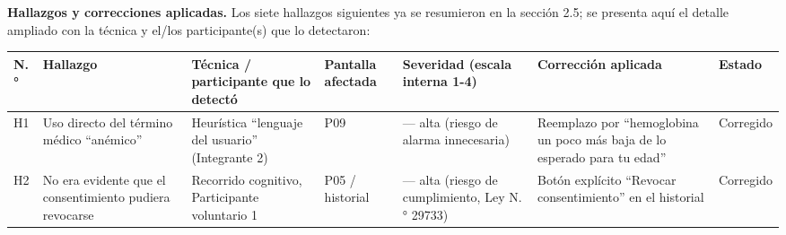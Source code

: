 \documentclass[11pt,a4paper]{article}
\begin{document}
\textbf{Hallazgos y correcciones aplicadas.} Los siete hallazgos siguientes ya se resumieron en la sección 2.5; se presenta aquí el detalle ampliado con la técnica y el/los participante(s) que lo detectaron:

{\small
\begin{longtable}[]{@{}
  >{\raggedright\arraybackslash}p{}
  >{\raggedright\arraybackslash}p{}
  >{\raggedright\arraybackslash}p{}
  >{\raggedright\arraybackslash}p{}
  >{\raggedright\arraybackslash}p{}
  >{\raggedright\arraybackslash}p{}
  >{\raggedright\arraybackslash}p{}@{}}
\toprule\noalign{}
\begin{minipage}[b]{\linewidth}\raggedright
N.°
\end{minipage} & \begin{minipage}[b]{\linewidth}\raggedright
Hallazgo
\end{minipage} & \begin{minipage}[b]{\linewidth}\raggedright
Técnica / participante que lo detectó
\end{minipage} & \begin{minipage}[b]{\linewidth}\raggedright
Pantalla afectada
\end{minipage} & \begin{minipage}[b]{\linewidth}\raggedright
Severidad (escala interna 1-4)
\end{minipage} & \begin{minipage}[b]{\linewidth}\raggedright
Corrección aplicada
\end{minipage} & \begin{minipage}[b]{\linewidth}\raggedright
Estado
\end{minipage} \\
\midrule\noalign{}
\endhead
\bottomrule\noalign{}
\endlastfoot
H1 & Uso directo del término médico ``anémico'' & Heurística ``lenguaje del usuario'' (Integrante 2) & P09 & 3 --- alta (riesgo de alarma innecesaria) & Reemplazo por ``hemoglobina un poco más baja de lo esperado para tu edad'' & Corregido \\
H2 & No era evidente que el consentimiento pudiera revocarse & Recorrido cognitivo, Participante voluntario 1 & P05 / historial & 3 --- alta (riesgo de cumplimiento, Ley N.° 29733) & Botón explícito ``Revocar consentimiento'' en el historial & Corregido \\

\end{longtable}}
\end{document}
